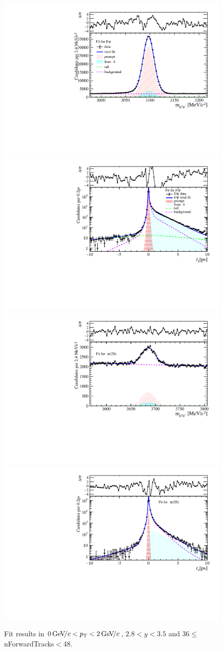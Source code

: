 \begin{figure}[H]
\begin{center}
\includegraphics[width=0.47\linewidth]{pdf/Jpsi/drawmassF/n4y2pt1.pdf}
\includegraphics[width=0.47\linewidth]{pdf/Jpsi/2DFitF/n4y2pt1.pdf}
\vspace*{-0.5cm}
\includegraphics[width=0.47\linewidth]{pdf/Psi2S/drawmassF/n4y2pt1.pdf}
\includegraphics[width=0.47\linewidth]{pdf/Psi2S/2DFitF/n4y2pt1.pdf}
\vspace*{-0.5cm}
\end{center}
\caption{Fit results in $0\text{\,Ge\kern -0.1em V\!/}c<p_{\mathrm{T}}<2\text{\,Ge\kern -0.1em V\!/}c$, $2.8<y<3.5$ and 36$\leq$nForwardTracks$<$48.}
\label{Fitn4y2pt1}
\end{figure}
